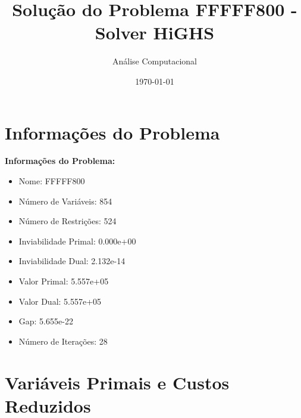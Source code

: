 \documentclass[12pt]{article}
\title{Solução do Problema FFFFF800 - Solver HiGHS}
\author{Análise Computacional}
\date{\today}
\begin{document}
\maketitle

\section{Informações do Problema}

\textbf{Informações do Problema:}
\begin{itemize}
\item Nome: FFFFF800
\item Número de Variáveis: 854
\item Número de Restrições: 524
\item Inviabilidade Primal: 0.000e+00
\item Inviabilidade Dual: 2.132e-14
\item Valor Primal: 5.557e+05
\item Valor Dual: 5.557e+05
\item Gap: 5.655e-22
\item Número de Iterações: 28
\end{itemize}


\section{Variáveis Primais e Custos Reduzidos}
\end{document}
